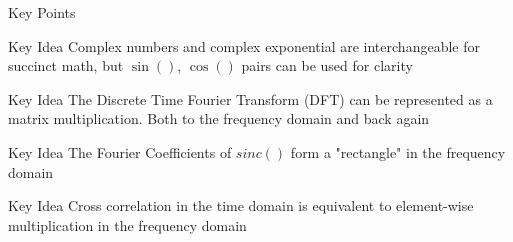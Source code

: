 \begin{frame}{Key Points}
	
	\begin{block}{Key Idea}
		Complex numbers and complex exponential are interchangeable for succinct math, but $\sin()$, $\cos()$ pairs can be used for clarity 
	\end{block}
	
	\begin{block}{Key Idea}
			The Discrete Time Fourier Transform (DFT) can be represented as a matrix multiplication. Both to the frequency domain and back again
		\end{block}
		
		\begin{block}{Key Idea}
			The Fourier Coefficients of $sinc{()}$ form a "rectangle" in the frequency domain
		\end{block}
		
		\begin{block}{Key Idea}
   Cross correlation in the time domain is equivalent to element-wise multiplication in the frequency domain
		\end{block}
		
%		
	\end{frame}